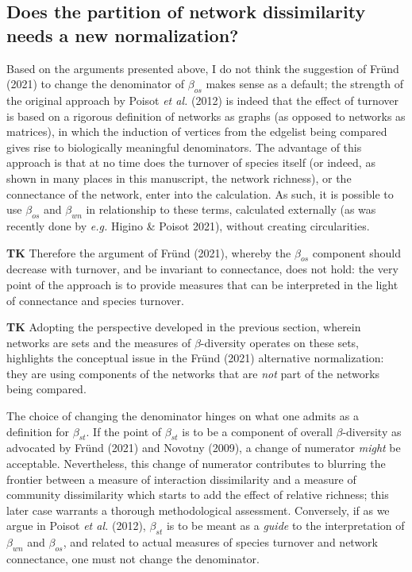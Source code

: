 \documentclass[11pt]{article}
\begin{document}
\hypertarget{does-the-partition-of-network-dissimilarity-needs-a-new-normalization}{%
\subsection{Does the partition of network dissimilarity needs a new
normalization?}\label{does-the-partition-of-network-dissimilarity-needs-a-new-normalization}}

Based on the arguments presented above, I do not think the suggestion of
Fründ (2021) to change the denominator of \(\beta_{os}\) makes sense as
a default; the strength of the original approach by Poisot \emph{et al.}
(2012) is indeed that the effect of turnover is based on a rigorous
definition of networks as graphs (as opposed to networks as matrices),
in which the induction of vertices from the edgelist being compared
gives rise to biologically meaningful denominators. The advantage of
this approach is that at no time does the turnover of species itself (or
indeed, as shown in many places in this manuscript, the network
richness), or the connectance of the network, enter into the
calculation. As such, it is possible to use \(\beta_{os}\) and
\(\beta_{wn}\) in relationship to these terms, calculated externally (as
was recently done by \emph{e.g.} Higino \& Poisot 2021), without
creating circularities.

\textbf{TK} Therefore the argument of Fründ (2021), whereby the
\(\beta_{os}\) component should decrease with turnover, and be invariant
to connectance, does not hold: the very point of the approach is to
provide measures that can be interpreted in the light of connectance and
species turnover.

\textbf{TK} Adopting the perspective developed in the previous section,
wherein networks are sets and the measures of \(\beta\)-diversity
operates on these sets, highlights the conceptual issue in the Fründ
(2021) alternative normalization: they are using components of the
networks that are \emph{not} part of the networks being compared.

The choice of changing the denominator hinges on what one admits as a
definition for \(\beta_{st}\). If the point of \(\beta_{st}\) is to be a
component of overall \(\beta\)-diversity as advocated by Fründ (2021)
and Novotny (2009), a change of numerator \emph{might} be acceptable.
Nevertheless, this change of numerator contributes to blurring the
frontier between a measure of interaction dissimilarity and a measure of
community dissimilarity which starts to add the effect of relative
richness; this later case warrants a thorough methodological assessment.
Conversely, if as we argue in Poisot \emph{et al.} (2012),
\(\beta_{st}\) is to be meant as a \emph{guide} to the interpretation of
\(\beta_{wn}\) and \(\beta_{os}\), and related to actual measures of
species turnover and network connectance, one must not change the
denominator.
\end{document}
